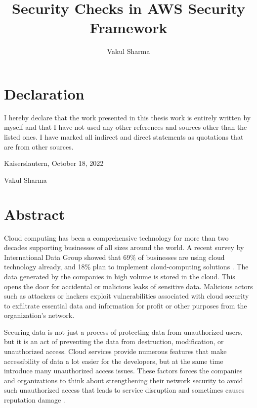 \documentclass[a4paper,11pt]{report}
\newcommand\blankpage{%
    \null
    \thispagestyle{empty}%
    \addtocounter{page}{-1}%
    \newpage}
\begin{document}
\title{Security Checks in AWS Security Framework}

\author{Vakul Sharma}

\maketitle


\afterpage{\blankpage}
\cleardoublepage
\section*{Declaration}
\text
I hereby declare that the work presented in this thesis work is entirely written by myself and that I have not used any other references and sources other than the listed ones.
I have marked all indirect and direct statements as
quotations that are from other sources.\\

\raggedright{Kaiserslautern, October 18, 2022}\\

\hfill \break
\raggedright{Vakul Sharma}

\afterpage{\blankpage}
\cleardoublepage

\section*{Abstract}
\text
Cloud computing has been a comprehensive technology for more
than two decades supporting
businesses of all sizes around the world.
A recent survey by International Data Group showed that 69\%
of businesses are using cloud technology already, and
18\% plan
to implement cloud-computing solutions \cite{1}.
The data generated by the companies in high volume is
stored in the cloud.
This opens the door for accidental or malicious leaks of sensitive data.
Malicious actors such as attackers or hackers exploit vulnerabilities associated with cloud security to exfiltrate essential data and information for profit or other purposes from the organization’s network.

\hfill \break

Securing data is not just a process of protecting data
from unauthorized users, but it is an act of preventing
the data from destruction, modification, or
unauthorized access.
Cloud services provide numerous features that make accessibility of data a lot easier for the developers, but at the same time introduce many unauthorized access issues.
These factors forces the companies and organizations
to think
about strengthening
their network security to avoid such unauthorized access that leads to service disruption and sometimes causes reputation damage \cite{1}.
\end{document}

